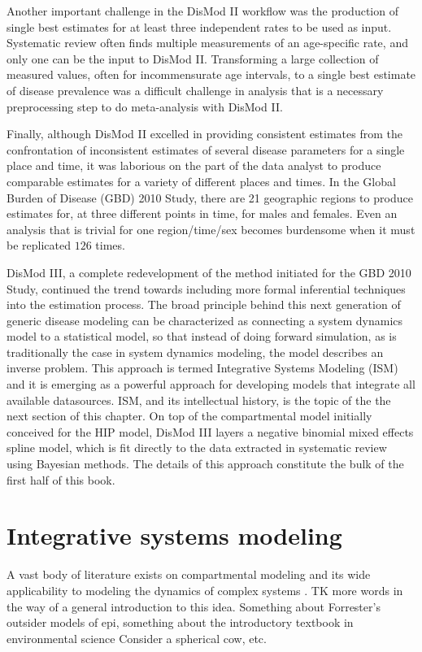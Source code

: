 Another important challenge in the DisMod II workflow was the
production of single best estimates for at least three independent
rates to be used as input.  Systematic review often finds multiple
measurements of an age-specific rate, and only one can be the input to
DisMod II.  Transforming a large collection of measured values, often
for incommensurate age intervals, to a single best estimate of disease
prevalence was a difficult challenge in analysis that is a necessary
preprocessing step to do meta-analysis with DisMod II.

Finally, although DisMod II excelled in providing consistent estimates
from the confrontation of inconsistent estimates of several disease
parameters for a single place and time, it was laborious on the part
of the data analyst to produce comparable estimates for a variety of
different places and times. In the Global Burden of Disease (GBD) 2010
Study, there are 21 geographic regions to produce estimates for, at
three different points in time, for males and females. Even an
analysis that is trivial for one region/time/sex becomes burdensome
when it must be replicated $126$ times.

DisMod III, a complete redevelopment of the method initiated for the
GBD 2010 Study, continued the trend towards including more formal
inferential techniques into the estimation process.  The broad
principle behind this next generation of generic disease modeling can
be characterized as connecting a system dynamics model to a
statistical model, so that instead of doing forward simulation, as is
traditionally the case in system dynamics modeling, the model
describes an inverse problem. This approach is termed Integrative
Systems Modeling (ISM) and it is emerging as a powerful approach for
developing models that integrate all available datasources.  ISM, and
its intellectual history, is the topic of the the next section of this
chapter.  On top of the compartmental model initially conceived for
the HIP model, DisMod III layers a negative binomial mixed effects
spline model, which is fit directly to the data extracted in
systematic review using Bayesian methods.  The details of this
approach constitute the bulk of the first half of this book.

\section{Integrative systems modeling}
\label{intro-ism}
A vast body of literature exists on compartmental modeling and its
wide applicability to modeling the dynamics of complex systems
\cite{Forrester_Principles_1968, Meadows_Thinking_2008,
  Bossel_Systems_2007}.  TK more words in the way of a general
introduction to this idea.  Something about Forrester's outsider
models of epi, something about the introductory textbook in
environmental science Consider a spherical cow, etc.

